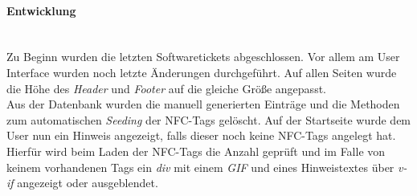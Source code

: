 \documentclass[10pt, a4paper]{article}
\begin{document}
\begin{onehalfspace}
\paragraph*{Entwicklung} $~$ \\
Zu Beginn wurden die letzten Softwaretickets abgeschlossen. Vor allem am User Interface wurden noch letzte Änderungen durchgeführt.
Auf allen Seiten wurde die Höhe des \textit{Header} und \textit{Footer} auf die gleiche Größe angepasst. \\
Aus der Datenbank wurden die manuell generierten Einträge und die Methoden zum automatischen \textit{Seeding} der NFC-Tags gelöscht.
Auf der Startseite wurde dem User nun ein Hinweis angezeigt, falls dieser noch keine NFC-Tags angelegt hat. Hierfür wird beim Laden der NFC-Tags die Anzahl geprüft und im Falle von keinem vorhandenen Tags ein \textit{div} mit einem \textit{GIF} und eines Hinweistextes über \textit{v-if} angezeigt oder ausgeblendet.

\end{onehalfspace}
\end{document}
